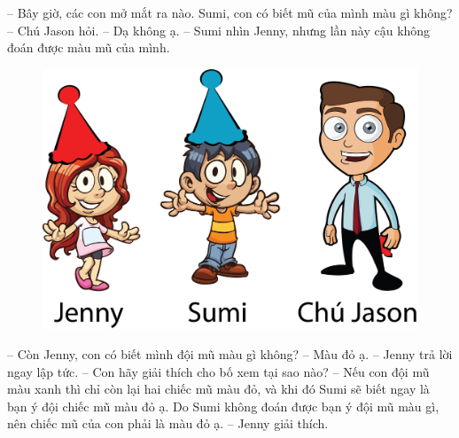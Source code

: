 	\vskip 0.1cm
	-- Bây giờ, các con mở mắt ra nào. Sumi, con có biết mũ của mình màu gì không? -- Chú  Jason hỏi.
	\vskip 0.1cm
	-- Dạ không ạ. -- Sumi nhìn Jenny, nhưng lần này cậu không đoán được màu mũ của mình.
	\vskip 0.1cm
	\begin{multicols}{2}
		\begin{figure}[H]
			\centering
			\vspace*{-5pt}
			\captionsetup{labelformat= empty, justification=centering}
			\includegraphics[width=0.95\linewidth]{h2}
			\vspace*{-20pt}
		\end{figure}
		-- Còn Jenny, con có biết mình đội mũ màu  gì không?
		\vskip 0.1cm
		-- Màu đỏ ạ. -- Jenny trả lời ngay lập tức.
		\vskip 0.1cm
		-- Con hãy giải thích cho bố xem tại sao nào?
		\vskip 0.1cm
		-- Nếu con đội mũ màu xanh thì chỉ còn lại hai chiếc mũ màu đỏ, và khi đó Sumi sẽ biết ngay là bạn ý đội chiếc mũ màu đỏ ạ. Do Sumi không đoán được bạn ý đội mũ màu gì, nên chiếc mũ của con phải là màu đỏ ạ. – Jenny giải thích.
	\end{multicols}
